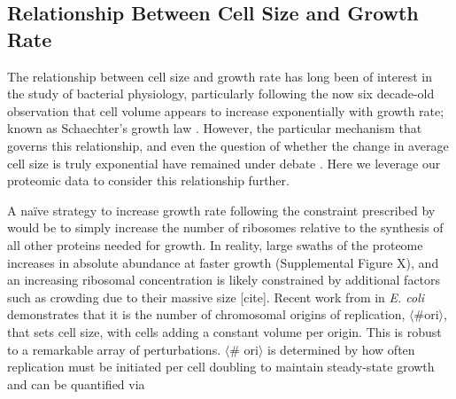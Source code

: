 
\subsection{Relationship Between Cell Size and Growth Rate}
The relationship between cell size and growth rate has long been of interest in
the study of bacterial physiology, particularly following the now six decade-old
observation that cell volume appears to increase exponentially with growth rate;
known as Schaechter's growth law  \citep{schaechter1958, taheriaraghi2015}.
However, the particular mechanism that governs this relationship, and even the
question of whether the change in average cell size is truly exponential have
remained under debate \citep{si2017, harris2018}. Here we leverage our proteomic
data to consider this relationship further.

A na\"ive strategy to increase growth rate following the constraint prescribed
by  would be to simply increase the number of
ribosomes relative to the synthesis of all other proteins needed for growth. In
reality, large swaths of the proteome increases in absolute abundance at faster
growth (Supplemental Figure X), and an increasing ribosomal concentration is
likely constrained by additional factors such as crowding due to their massive
size [cite]. Recent work from \cite{si2017} in \textit{E. coli} demonstrates
that it is the number of chromosomal origins of replication, $\langle\text{\#
ori}\rangle$, that sets cell size, with cells adding a constant volume per
origin. This is robust to a remarkable array of perturbations. $\langle$\#
ori$\rangle$ is determined by how often replication must be initiated per cell
doubling to maintain steady-state growth and can be quantified via

